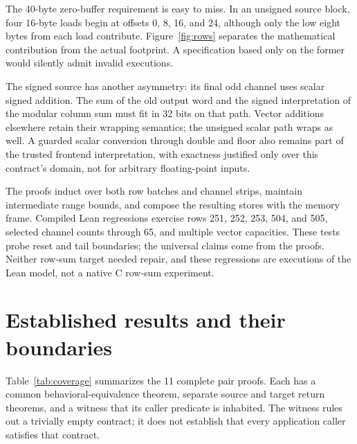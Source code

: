 \documentclass[11pt]{article}
\begin{document}
The 40-byte zero-buffer requirement is easy to miss. In an unsigned source block, four 16-byte loads begin at offsets 0, 8, 16, and 24, although only the low eight bytes from each load contribute. Figure~\ref{fig:rows} separates the mathematical contribution from the actual footprint. A specification based only on the former would silently admit invalid executions.

The signed source has another asymmetry: its final odd channel uses scalar signed addition. The sum of the old output word and the signed interpretation of the modular column sum must fit in 32 bits on that path. Vector additions elsewhere retain their wrapping semantics; the unsigned scalar path wraps as well. A guarded scalar conversion through double and floor also remains part of the trusted frontend interpretation, with exactness justified only over this contract's domain, not for arbitrary floating-point inputs.

The proofs induct over both row batches and channel strips, maintain intermediate range bounds, and compose the resulting stores with the memory frame. Compiled Lean regressions exercise rows 251, 252, 253, 504, and 505, selected channel counts through 65, and multiple vector capacities. These tests probe reset and tail boundaries; the universal claims come from the proofs. Neither row-sum target needed repair, and these regressions are executions of the Lean model, not a native C row-sum experiment.

\section{Established results and their boundaries}
Table~\ref{tab:coverage} summarizes the 11 complete pair proofs. Each has a common behavioral-equivalence theorem, separate source and target return theorems, and a witness that its caller predicate is inhabited. The witness rules out a trivially empty contract; it does not establish that every application caller satisfies that contract.
\end{document}
